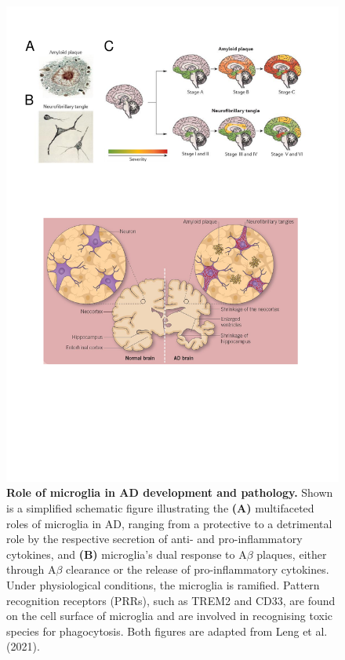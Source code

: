 \begin{figure}[!htp]
	\centering
	\includegraphics[page=8,trim={0 9cm 0cm 0cm},clip, scale = 0.8]{Figures/Introduction_Figures.pdf}
	\captionsetup{width=0.95\textwidth,singlelinecheck=off}
	\caption[Role of microglia in AD development and pathology]%
	{\textbf{Role of microglia in AD development and pathology.} Shown is a simplified schematic figure illustrating the \textbf{(A)} multifaceted roles of microglia in AD, ranging from a protective to a detrimental role by the respective secretion of anti- and pro-inflammatory cytokines, and \textbf{(B)} microglia's dual response to A$\beta$ plaques, either through A$\beta$ clearance or the release of pro-inflammatory cytokines. Under physiological conditions, the microglia is ramified. Pattern recognition receptors (PRRs), such as TREM2 and CD33, are found on the cell surface of microglia and are involved in recognising toxic species for phagocytosis. Both figures are adapted from Leng et al. (2021)\cite{Leng2021a}.  
	}
	\label{fig:microglia_AD}
\end{figure}


